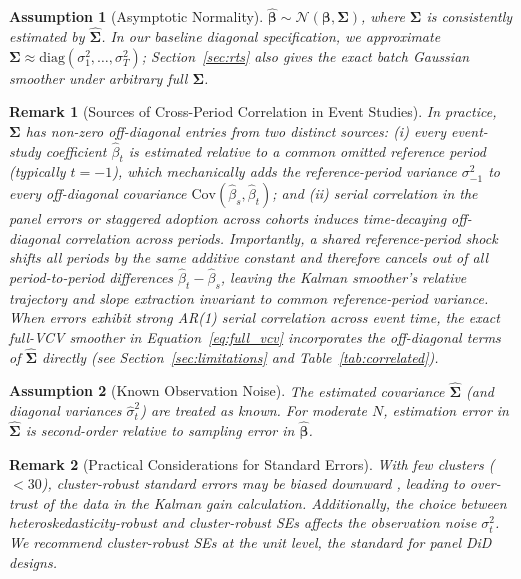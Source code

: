 \documentclass[12pt]{article}
\newtheorem{assumption}{Assumption}
\newtheorem{remark}{Remark}
\begin{document}
\begin{assumption}[Asymptotic Normality]\label{a:normal}
$\hat{\boldsymbol\beta} \sim \mathcal{N}(\boldsymbol\beta, \boldsymbol\Sigma)$, where $\boldsymbol\Sigma$ is consistently estimated by $\widehat{\boldsymbol\Sigma}$. In our baseline diagonal specification, we approximate $\boldsymbol\Sigma \approx \text{diag}(\sigma^2_1, \ldots, \sigma^2_T)$; Section~\ref{sec:rts} also gives the exact batch Gaussian smoother under arbitrary full $\boldsymbol\Sigma$.
\end{assumption}

\begin{remark}[Sources of Cross-Period Correlation in Event Studies]
In practice, $\boldsymbol\Sigma$ has non-zero off-diagonal entries from two distinct sources: (i) every event-study coefficient $\hat{\beta}_t$ is estimated relative to a common omitted reference period (typically $t = -1$), which mechanically adds the reference-period variance $\sigma^2_{-1}$ to every off-diagonal covariance $\text{Cov}(\hat{\beta}_s, \hat{\beta}_t)$; and (ii) serial correlation in the panel errors or staggered adoption across cohorts induces time-decaying off-diagonal correlation across periods. Importantly, a shared reference-period shock shifts all periods by the same additive constant and therefore cancels out of all period-to-period differences $\hat{\beta}_t - \hat{\beta}_s$, leaving the Kalman smoother's relative trajectory and slope extraction invariant to common reference-period variance. When errors exhibit strong AR(1) serial correlation across event time, the exact full-VCV smoother in Equation~\eqref{eq:full_vcv} incorporates the off-diagonal terms of $\widehat{\boldsymbol\Sigma}$ directly (see Section~\ref{sec:limitations} and Table~\ref{tab:correlated}).
\end{remark}

\begin{assumption}[Known Observation Noise]\label{a:known_se}
The estimated covariance $\widehat{\boldsymbol\Sigma}$ (and diagonal variances $\hat{\sigma}^2_t$) are treated as known. For moderate $N$, estimation error in $\widehat{\boldsymbol\Sigma}$ is second-order relative to sampling error in $\hat{\boldsymbol\beta}$.
\end{assumption}

\begin{remark}[Practical Considerations for Standard Errors]
With few clusters ($<30$), cluster-robust standard errors may be biased downward \citep{cameron2008bootstrap}, leading to over-trust of the data in the Kalman gain calculation. Additionally, the choice between heteroskedasticity-robust and cluster-robust SEs affects the observation noise $\sigma_t^2$. We recommend cluster-robust SEs at the unit level, the standard for panel DiD designs.
\end{remark}
\end{document}
